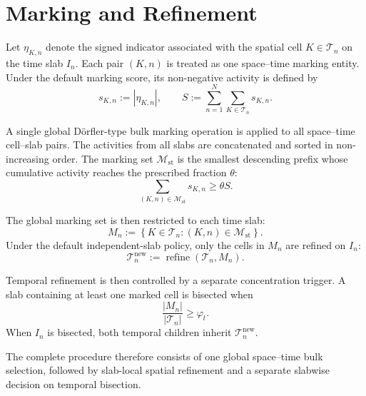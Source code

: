 \section{Marking and Refinement}
\label{sec:marking-refinement}

Let \(\eta_{K,n}\) denote the signed indicator associated with the spatial cell \(K\in\mathcal T_n\) on the time slab \(I_n\). Each pair \((K,n)\) is treated as one space--time marking entity. Under the default marking score, its non-negative activity is defined by
\begin{equation}
  s_{K,n}:=|\eta_{K,n}|,
  \qquad
  S:=\sum_{n=1}^{N}\sum_{K\in\mathcal T_n}s_{K,n}.
  \label{eq:marking-activity}
\end{equation}

A single global D\"orfler-type bulk marking operation \cite{Dorfler1996} is applied to all space--time cell--slab pairs. The activities from all slabs are concatenated and sorted in non-increasing order. The marking set \(\mathcal M_{\mathrm{st}}\) is the smallest descending prefix whose cumulative activity reaches the prescribed fraction \(\theta\):
\begin{equation}
  \sum_{(K,n)\in\mathcal M_{\mathrm{st}}}s_{K,n}
  \ge
  \theta S.
  \label{eq:space-time-dorfler}
\end{equation}

The global marking set is then restricted to each time slab:
\begin{equation}
  M_n
  :=
  \left\{
    K\in\mathcal T_n:
    (K,n)\in\mathcal M_{\mathrm{st}}
  \right\}.
  \label{eq:slabwise-marked-cells}
\end{equation}
Under the default independent-slab policy, only the cells in \(M_n\) are refined on \(I_n\):
\begin{equation}
  \mathcal T_n^{\mathrm{new}}
  :=
  \operatorname{refine}(\mathcal T_n,M_n).
  \label{eq:slabwise-spatial-refinement}
\end{equation}

Temporal refinement is then controlled by a separate concentration trigger. A slab containing at least one marked cell is bisected when
\begin{equation}
  \frac{|M_n|}{|\mathcal T_n|}
  \ge
  \varphi_t.
  \label{eq:within-slab-time-trigger}
\end{equation}
When \(I_n\) is bisected, both temporal children inherit \(\mathcal T_n^{\mathrm{new}}\).

The complete procedure therefore consists of one global space--time bulk selection, followed by slab-local spatial refinement and a separate slabwise decision on temporal bisection.

